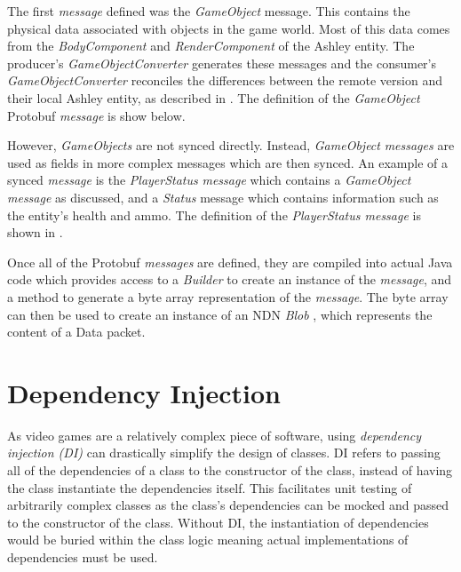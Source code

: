 The first \textit{message} defined was the \textit{GameObject} message. This contains the physical data associated with objects in the \game{} game world. Most of this data comes from the \textit{BodyComponent} and \textit{RenderComponent} of the Ashley entity. The producer's \textit{GameObjectConverter} generates these messages and the consumer's \textit{GameObjectConverter} reconciles the differences between the remote version and their local Ashley entity, as described in . The definition of the \textit{GameObject} Protobuf \textit{message} is show below.



However, \textit{GameObjects} are not synced directly. Instead, \textit{GameObject} \textit{messages} are used as fields in more complex messages which are then synced. An example of a synced \textit{message} is the \textit{PlayerStatus} \textit{message} which contains a \textit{GameObject message} as discussed, and a \textit{Status} message which contains information such as the entity's health and ammo. The definition of the \textit{PlayerStatus message} is shown in .




Once all of the Protobuf \textit{messages} are defined, they are compiled into actual Java code which provides access to a \textit{Builder} to create an instance of the \textit{message}, and a method to generate a byte array representation of the \textit{message}. The byte array can then be used to create an instance of an NDN \textit{Blob} \cite{ndn-ccl-blob}, which represents the content of a Data packet. 

\section{Dependency Injection}
As video games are a relatively complex piece of software, using \textit{dependency injection (DI)} can drastically simplify the design of classes. DI refers to passing all of the dependencies of a class to the constructor of the class, instead of having the class instantiate the dependencies itself. This facilitates unit testing of arbitrarily complex classes as the class's dependencies can be mocked and passed to the constructor of the class. Without DI, the instantiation of dependencies would be buried within the class logic meaning actual implementations of dependencies must be used.

